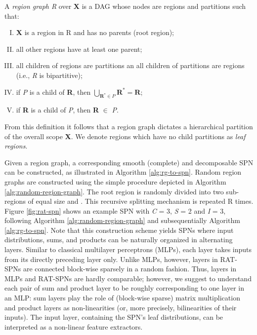 A  \textit{region graph R} over \textbf{X} is a DAG whose nodes are regions and partitions such that:
\begin{enumerate}[I.]
  \item \textbf{X} is a region in R and has no parents (root region);
  \item all other regions have at least one parent;
  \item all children of regions are partitions an all children of partitions are regions (i.e., \textit{R} is bipartitive);
  \item if \textit{P} is a child of \textbf{R}, then $\bigcup_{\mathbf{R^\ast}\in\mathit{P}}\mathbf{R^\ast} = \mathbf{R}$;
  \item if \textbf{R} is a child of \textit{P}, then \textbf{R} $\in$ \textit{P}.
\end{enumerate}
From this definition it follows that a region graph dictates a hierarchical partition of the overall scope \textbf{X}. We denote regions which have no child partitions as \textit{leaf regions}.

Given a region graph, a corresponding smooth (complete) and decomposable SPN can be constructed, as illustrated in Algorithm \ref{alg:rg-to-spn}. Random region graphs are constructed using the simple procedure depicted in Algorithm \ref{alg:random-region-graph}. The root region is randomly divided into two sub-regions of equal size and . This recursive splitting mechanism is repeated R times. Figure \ref{fig:rat-spn} shows an example SPN with \textit{C} = 3, \textit{S} = 2 and \textit{I} = 3, following Algorithm \ref{alg:random-region-graph} and subsequentially Algorithm \ref{alg:rg-to-spn}. Note that this construction scheme yields SPNs where input distributions, sums, and products can be naturally organized in alternating layers. Similar to classical multilayer perceptrons (MLPs), each layer takes inputs from its directly preceding layer only. Unlike MLPs, however, layers in RAT-SPNs are connected block-wise sparsely in a random fashion. Thus, layers in MLPs and RAT-SPNs are hardly comparable; however, we suggest to understand each pair of sum and product layer to be roughly corresponding to one layer in an MLP: sum layers play the role of (block-wise sparse) matrix multiplication and product layers as non-linearities (or, more precisely, bilinearities of their inputs). The input layer, containing the SPN’s leaf distributions, can be interpreted as a non-linear feature extractors.

